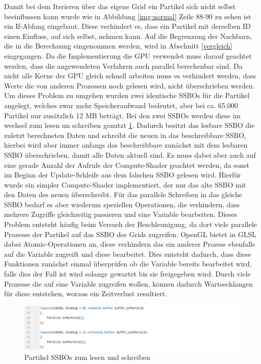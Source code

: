 \documentclass[intern,palatino]{cgBA}
\begin{document}
Damit bei dem Iterieren über das eigene Grid ein Partikel sich nicht selbst beeinflussen kann wurde wie in Abbildung \ref{img:normal} Zeile 88-90 zu sehen ist ein If-Abfang eingebaut. Diese verhindert es, dass ein Partikel mit derselben ID einen Einfluss, auf sich selbst, nehmen kann. Auf die Begrenzung der Nachbarn, die in die Berechnung eingenommen werden, wird in Abschnitt \ref{vergleich} eingegangen.
\newline
Da die Implementierung die GPU verwendet muss darauf geachtet werden, dass die angewendeten Verfahren auch parallel berechenbar sind. Da nicht alle Kerne der GPU gleich schnell arbeiten muss es verhindert werden, dass Werte die von anderen Prozessen noch gelesen wird, nicht überschrieben werden.
Um dieses Problem zu umgehen wurden zwei identische SSBOs für die Partikel angelegt, welches zwar mehr Speicheraufwand bedeutet, aber bei ca. 65.000 Partikel nur zusätzlich 12 MB beträgt. Bei den zwei SSBOs werden diese im wechsel zum lesen un schreiben genutzt \ref{img:flipflop}. Dadurch besitzt das lesbare SSBO die zuletzt berechneten Daten und schreibt die neuen in das beschreibbare SSBO, hierbei wird aber immer anfangs das beschreibbare zunächst mit dem lesbaren SSBO überschrieben, damit alle Daten aktuell sind.
Es muss dabei aber auch auf eine gerade Anzahl der Aufrufe der Compute-Shader geachtet werden, da sonst im Beginn der Update-Schleife aus dem falschen SSBO gelesen wird. Hierfür wurde ein simpler Compute-Shader implementiert, der nur das alte SSBO mit den Daten des neuen überschreibt.
\newline
Für das parallele Schreiben in das gleiche SSBO bedarf es aber wiederum speziellen Operationen, die verhindern, dass mehrere Zugriffe gleichzeitig passieren und eine Variable bearbeiten. Dieses Problem entsteht häufig beim Versuch der Beschleunigung, da dort viele parallele Prozesse der Partikel auf das SSBO des Grids zugreifen.
\newline
OpenGL bietet in GLSL dabei Atomic-Operationen an, diese verhindern das ein anderer Prozess ebenfalls auf die Variable zugreift und diese bearbeitet. Dies entsteht dadurch, dass diese Funktionen zunächst einmal überprüfen ob die Variable bereits bearbeitet wird, falls dies der Fall ist wird solange gewartet bis sie freigegeben wird. Durch viele Prozesse die auf eine Variable zugreifen wollen, können dadurch Warteschlangen für diese entstehen, woraus ein Zeitverlust resultiert.

\begin{figure}[H]
	\centering
	\includegraphics[width=1.3\columnwidth]{Bilder/Flipflop.jpg}
	\caption{Partikel SSBOs zum lesen und schreiben}
	\label{img:flipflop}
\end{figure}
\end{document}
